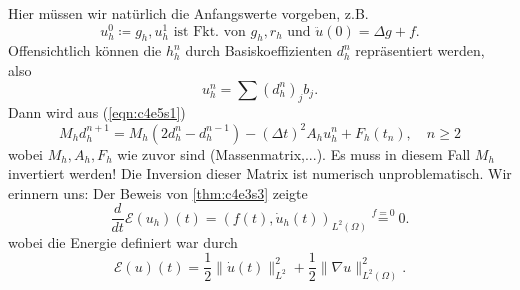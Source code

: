 \documentclass[../skript.tex]{subfiles}
\begin{document}
Hier müssen wir natürlich die Anfangswerte vorgeben, z.B.
\begin{equation}\label{eqn:c4e5s2}
	u_h^0 \coloneqq g_h, u_h^1\text{ ist Fkt. von }g_h,r_h\text{ und }\ddot{u}(0) = \Delta g+f.
\end{equation}
Offensichtlich können die $h_h^n$ durch Basiskoeffizienten $d_h^n$ repräsentiert werden, also
\[
	u_h^n = \sum (d_h^n)_j b_j.
\]
Dann wird aus (\ref{eqn:c4e5s1}) 
\[
	M_h d_h^{n+1} = M_h (2d_h^n - d_h^{n-1}) - (\Delta t)^2A_h u_h^n + F_h(t_n),\quad n\geq 2
\]
wobei $M_h,A_h,F_h$ wie zuvor sind (Massenmatrix,...). Es muss in diesem Fall $M_h$ invertiert werden! Die Inversion dieser Matrix ist numerisch unproblematisch.\newline\newline\noindent
Wir erinnern uns: Der Beweis von \cref{thm:c4e3s3} zeigte
\[
    \frac{d}{dt} \mathcal{E}(u_h)(t) = (f(t),\dot{u}_h(t))_{L^2(\Omega)} \overset{f=0}= 0.
\]
wobei die Energie definiert war durch
\[
	\mathcal{E}(u)(t) = \frac{1}{2} \|\dot{u}(t)\|_{L^2}^2 + \frac{1}{2} \|\nabla u\|_{L^2(\Omega)}^2.
\]
\end{document}

